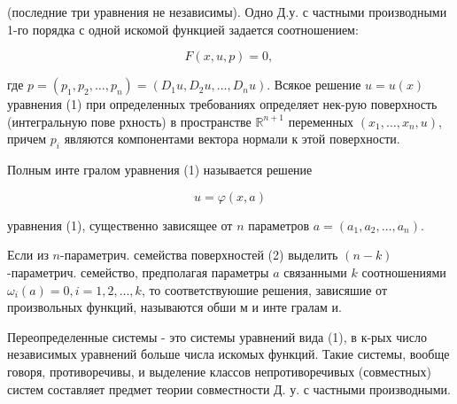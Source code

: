 \documentclass[10pt]{article}
\begin{document}
(последние три уравнения не независимы). Одно Д.у. с частными производными 1-го порядка с одной искомой функцией задается соотношением:



\[

F(x, u, p)=0 \text {, }

\]



где $p=\left(p_{1}, p_{2}, \ldots, p_{n}\right)=\left(D_{1} u, D_{2} u, \ldots, D_{n} u\right)$. Всякое решение $u=u(x)$ уравнения (1) при определенных требованиях определяет нек-рую поверхность (интегральную пове рхность) в пространстве $\mathbb{R}^{n+1}$ переменных $\left(x_{1}, \ldots, x_{n}, u\right)$, причем $p_{i}$ являются компонентами вектора нормали к этой поверхности.



Полным инте гралом уравнения (1) называется решение



\[

u=\varphi(x, a)

\]



уравнения (1), существенно зависящее от $n$ параметров $a=\left(a_{1}, a_{2}, \ldots, a_{n}\right)$.



Если из $n$-параметрич. семейства поверхностей (2) выделить $(n-k)$-параметрич. семейство, предполагая параметры $a$ связанными $k$ соотношениями $\omega_{i}(a)=0, i=1,2, \ldots, k$, то соответствуюшие решения, зависяшие от произвольных функций, называются обши м и инте гралам и.



Переопределенные системы - это системы уравнений вида (1), в к-рых число независимых уравнений больше числа искомых функций. Такие системы, вообще говоря, противоречивы, и выделение классов непротиворечивых (совместных) систем составляет предмет теории совместности Д. у. с частными производными.
\end{document}
